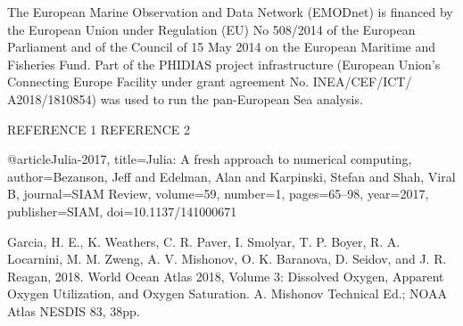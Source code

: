 \documentclass[essd, manuscript]{copernicus}
\begin{document}

\begin{acknowledgements}
The European Marine Observation and Data Network (EMODnet) is financed by the European Union under Regulation (EU) No 508/2014 of the European Parliament and of the Council of 15 May 2014 on the European Maritime and Fisheries Fund. Part of the PHIDIAS project infrastructure (European Union’s Connecting Europe Facility under grant agreement No. INEA/CEF/ICT/ A2018/1810854) was used to run the pan-European Sea analysis.
\end{acknowledgements}




\begin{thebibliography}{}
REFERENCE 1
REFERENCE 2
\end{thebibliography}


@article{Julia-2017,
   title={Julia: A fresh approach to numerical computing},
   author={Bezanson, Jeff and Edelman, Alan and Karpinski, Stefan and Shah, Viral B},
   journal={SIAM {R}eview},
   volume={59},
   number={1},
   pages={65--98},
   year={2017},
   publisher={SIAM},
   doi={10.1137/141000671}
}

Garcia, H. E., K. Weathers, C. R. Paver, I. Smolyar, T. P. Boyer, R. A. Locarnini, M. M. Zweng, A. V. Mishonov, O. K. Baranova, D. Seidov, and J. R. Reagan, 2018. World Ocean Atlas 2018, Volume 3: Dissolved Oxygen, Apparent Oxygen Utilization, and Oxygen Saturation. A. Mishonov Technical Ed.; NOAA Atlas NESDIS 83, 38pp.
\end{document}
